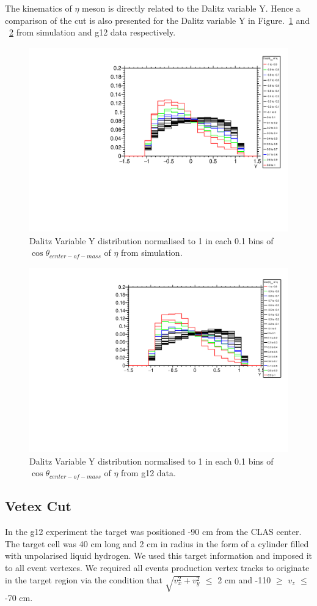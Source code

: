 The kinematics of $\eta$ meson is directly related to the Dalitz variable Y. Hence a comparison of the cut is also presented for the Dalitz variable Y in Figure.~\ref{Fig_CsE_3} and  ~\ref{Fig_CsE_4} from simulation and g12 data respectively.    

\begin{figure}[ht!]
\centerline{
\includegraphics[width=12cm,height=8cm]{eta_CosTh_Cut.pdf}}
\caption{Dalitz Variable Y distribution normalised to 1 in each 0.1 bins of $\cos\theta_{center-of-mass}$ of $\eta$ from simulation.}
\label{Fig_CsE_3}
\end{figure}

\begin{figure}[ht!]
\centerline{
\includegraphics[width=12cm,height=8cm]{sim_CsEta.pdf}}
\caption{Dalitz Variable Y distribution normalised to 1 in each 0.1 bins of $\cos\theta_{center-of-mass}$ of $\eta$ from g12 data.}
\label{Fig_CsE_4}
\end{figure}

\subsection{Vetex Cut}
\label{VCut}
In the g12 experiment the target was positioned -90 cm from the CLAS center. The target cell was 40 cm long and 2 cm in radius in the form of a cylinder filled with unpolarised liquid hydrogen. We used this target information and imposed it to all event vertexes. We required all events  production vertex tracks to originate in the target region via the condition that $\sqrt{v_{x}^{2} + v_{y}^{2}}$ $\leq$ 2 cm and -110 $\geq$ $v_{z}$ $\leq$ -70 cm. 

